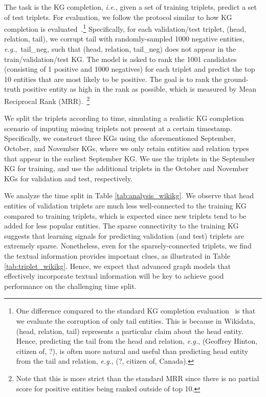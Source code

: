 \documentclass{article}
\newcommand{\ie}{\textit{i.e.}}
\newcommand{\eg}{\textit{e.g.}}
\begin{document}
{
The task is the KG completion, \ie, given a set of training  triplets, predict a set of test triplets. 
For evaluation, we follow the protocol similar to how KG completion is evaluated~\citep{bordes2013translating}.\footnote{One difference compared to the standard KG completion evaluation~\citep{bordes2013translating} is that we evaluate the corruption of only \textmd{tail} entities. This is because in Wikidata, (\textmd{head}, \textmd{relation}, \textmd{tail}) represents a particular claim about the \textmd{head} entity. Hence, predicting the tail from the head and relation, \eg, (\textmd{Geoffrey Hinton}, \textmd{citizen of}, \textmd{?}), is often more natural and useful than predicting head entity from the tail and relation, \eg, (\textmd{?}, \textmd{citizen of}, \textmd{Canada}). }
Specifically, for each validation/test triplet, (\textmd{head}, \textmd{relation}, \textmd{tail}), we corrupt \textmd{tail} with randomly-sampled 1000 negative entities, \eg,~\textmd{tail\_neg}, such that (\textmd{head}, \textmd{relation}, \textmd{tail\_neg}) does not appear in the train/validation/test KG. 
The model is asked to rank the 1001 candidates (consisting of 1 positive and 1000 negatives) for each triplet and predict the top 10 entities that are most likely to be positive. The goal is to rank the ground-truth positive entity as high in the rank as possible, which is measured by Mean Reciprocal Rank (MRR).~\footnote{Note that this is more strict than the standard MRR since there is no partial score for positive entities being ranked outside of top 10.}
} 
{
We split the triplets according to time, simulating a realistic KG completion scenario of imputing missing triplets not present at a certain timestamp.
Specifically, we construct three KGs using the aforementioned September, October, and November KGs,  where we only retain entities and relation types that appear in the earliest September KG.
We use the triplets in the September KG for training, and use the additional triplets in the October and November KGs for validation and test, respectively.

We analyze the time split in Table \ref{tab:analysis_wikikg}.
We observe that head entities of validation triplets are much less well-connected to the training KG compared to training triplets, which is expected since new triplets tend to be added for less popular entities. The sparse connectivity to the training KG suggests that learning signals for predicting validation (and test) triplets are extremely sparse.
Nonetheless, even for the sparsely-connected triplets, we find the textual information provides important clues, as illustrated in Table \ref{tab:triplet_wikikg}.
Hence, we expect that advanced graph models that effectively incorporate textual information will be key to achieve good performance on the challenging time split.
}
\end{document}
